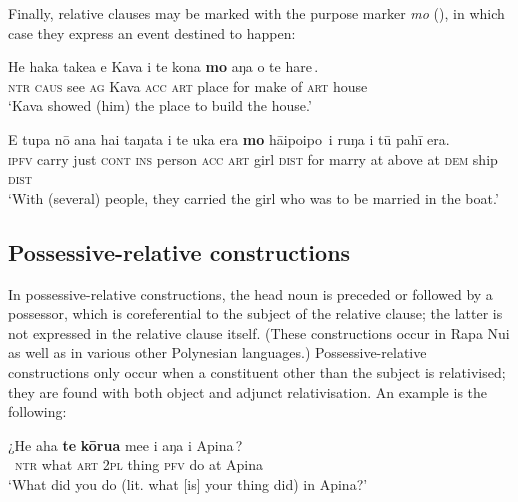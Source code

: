 Finally, relative clauses may be marked with the purpose marker \textit{mo} (), in which case they express an event destined to happen:

\ea\label{ex:11.120}
\gll He haka take{\ꞌ}a e Kava i te kona {\ob}\textbf{mo} aŋa o te hare\,{\cb}. \\
\textsc{ntr} \textsc{caus} see \textsc{ag} Kava \textsc{acc} \textsc{art} place {\db}for make of \textsc{art} house \\

\glt 
‘Kava showed (him) the place to build the house.’ \textstyleExampleref{[R229.217]} 
\z

\ea\label{ex:11.121}
\gll E tupa nō {\ꞌ}ana hai taŋata i te uka era {\ob}\textbf{mo} hāipoipo\,{\cb}  {\ꞌ}i ruŋa i tū pahī era.\\
\textsc{ipfv} carry just \textsc{cont} \textsc{ins} person \textsc{acc} \textsc{art} girl \textsc{dist} {\db}for marry  at above at \textsc{dem} ship \textsc{dist}\\

\glt 
‘With (several) people, they carried the girl who was to be married in the boat.’ \textstyleExampleref{[R539-3.034]}
\z

\subsection{Possessive-relative constructions}\label{sec:11.4.4}

In possessive-relative constructions, the head noun is preceded or followed by a possessor, which is coreferential to the subject of the relative clause; the latter is not expressed in the relative clause itself. (These constructions occur in Rapa Nui as well as in various other Polynesian languages.) Possessive-relative constructions only occur when a constituent other than the subject is relativised; they are found with both object and adjunct relativisation. An example is the following:

\ea\label{ex:11.122}
\gll ¿He aha \textbf{te} \textbf{kōrua} me{\ꞌ}e {\ob}i aŋa {\ꞌ}i {\ꞌ}Apina\,{\cb}? \\
~\textsc{ntr} what \textsc{art} \textsc{2pl} thing {\db}\textsc{pfv} do at Apina \\

\glt
‘What did you do (lit. what [is] your thing did) in Apina?’ \textstyleExampleref{[R301.197]} 
\z

